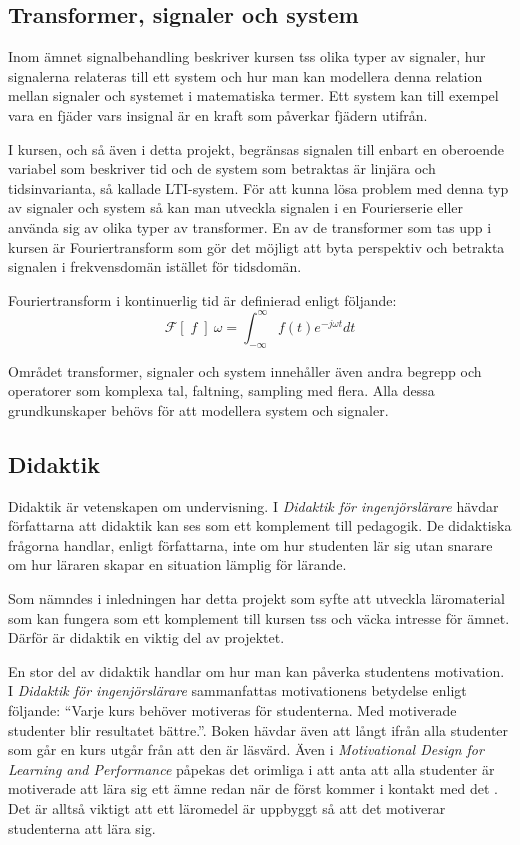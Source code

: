 \documentclass[12pt,a4paper,twoside,openright]{article}
\begin{document}
\subsection{Transformer, signaler och system}
Inom ämnet signalbehandling beskriver kursen \gls{tss} olika typer av
signaler, hur signalerna relateras till ett system och hur man kan
modellera denna relation mellan signaler och systemet i matematiska
termer. Ett system kan till exempel vara en fjäder vars insignal är en
kraft som påverkar fjädern utifrån.

I kursen, och så även i detta projekt, begränsas signalen till enbart
en oberoende variabel som beskriver tid och de system som
betraktas är linjära och tidsinvarianta, så kallade LTI-system. För
att kunna lösa problem med denna typ av signaler och system så kan man
utveckla signalen i en Fourierserie eller använda sig av olika typer
av transformer. En av de transformer som tas upp i kursen är
Fouriertransform som gör det möjligt att byta perspektiv och betrakta
signalen i frekvensdomän istället för tidsdomän.

Fouriertransform i kontinuerlig tid är definierad enligt följande:
\[\mathcal{F}[\;f\;]~\omega = \int_{-\infty}^{\infty} f(t) e^{-j \omega t} dt\]

Området transformer, signaler och system innehåller även andra begrepp
och operatorer som komplexa tal, faltning, sampling med flera. Alla
dessa grundkunskaper behövs för att modellera system och signaler.

\subsection{Didaktik}
\label{sec:didaktik}
Didaktik är vetenskapen om undervisning. I \textit{Didaktik för
  ingenjörslärare} \cite{didaktik_for_ingenjorslarare} hävdar
författarna att didaktik kan ses som ett komplement till pedagogik. De
didaktiska frågorna handlar, enligt författarna, inte om hur studenten
lär sig utan snarare om hur läraren skapar en situation lämplig för
lärande.

Som nämndes i inledningen har detta projekt som syfte att utveckla
läromaterial som kan fungera som ett komplement till kursen \gls{tss}
och väcka intresse för ämnet. Därför är didaktik en viktig del av
projektet.

En stor del av didaktik handlar om hur man kan påverka studentens
motivation.\\I \textit{Didaktik för ingenjörslärare} sammanfattas
motivationens betydelse enligt följande: ``Varje kurs behöver
motiveras för studenterna. Med motiverade studenter blir resultatet
bättre.''.  Boken hävdar även att långt ifrån alla studenter som går
en kurs utgår från att den är läsvärd. Även i \textit{Motivational
  Design for Learning and Performance} påpekas det orimliga i att anta
att alla studenter är motiverade att lära sig ett ämne redan när de
först kommer i kontakt med det \cite{motivational_design}. Det är
alltså viktigt att ett läromedel är uppbyggt så att det motiverar
studenterna att lära sig.
\end{document}
